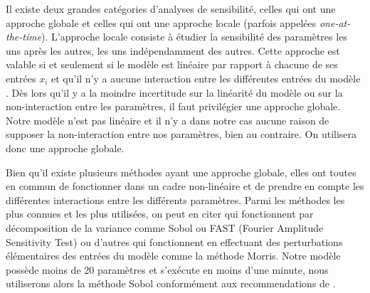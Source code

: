 Il existe deux grandes catégories d'analyses de sensibilité, celles qui ont une approche globale et celles qui ont une approche locale (parfois appelées \emph{one-at-the-time}).
L'approche locale consiste à étudier la sensibilité des paramètres les uns après les autres, les uns indépendamment des autres.
Cette approche est valable si et seulement si le modèle est linéaire par rapport à chacune de ses entrées $x_i$ et qu'il n'y a aucune interaction entre les différentes entrées du modèle \citep{saltelli2019so}.
Dès lors qu'il y a la moindre incertitude sur la linéarité du modèle ou sur la non-interaction entre les paramètres, il faut privilégier une approche globale.
Notre modèle n'est pas linéaire et il n'y a dans notre cas aucune raison de supposer la non-interaction entre nos paramètres, bien au contraire.
On utilisera donc une approche globale.

Bien qu'il existe plusieurs méthodes ayant une approche globale, elles ont toutes en commun de fonctionner dans un cadre non-linéaire et de prendre en compte les différentes interactions entre les différents paramètres.
Parmi les méthodes les plus connues et les plus utilisées, on peut en citer qui fonctionnent par décomposition de la variance comme Sobol ou FAST (Fourier Amplitude Sensitivity Test) ou d'autres qui fonctionnent en effectuant des perturbations élémentaires des entrées du modèle comme la méthode Morris.
Notre modèle possède moins de 20 paramètres et s'exécute en moins d'une minute, nous utiliserons alors la méthode Sobol conformément aux recommendations de \citet[chap. 6]{saltelli}.

